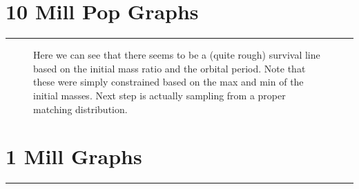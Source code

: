 \documentclass{article}
\theoremstyle{mytheoremstyle}
\theoremstyle{mytheoremstyle}
\theoremstyle{myproblemstyle}
\theoremstyle{myproblemstyle}
\newcounter{const}
\begin{document}
    \pagebreak
    \section{10 Mill Pop Graphs}
    \hrule
    \vspace{.5cm}




    



    \resizebox{0.9\textwidth}{!}{\label{g:OP-BH-Sol}} 

    \resizebox{0.9\textwidth}{!}{\label{g:OP-BH-Sol}} 

    \resizebox{0.9\textwidth}{!}{\label{g:OP-BH-Sol}} 
    
    \resizebox{0.9\textwidth}{!}{\label{g:BHSol_Masses}}

    \resizebox{0.9\textwidth}{!}{\label{g:OP-BH-Sol}} 


    \begin{figure}[h!]
    \resizebox{0.9\textwidth}{!}{}
    
    \caption{Here we can see that there seems to be a (quite rough) survival line based on the initial mass ratio and the orbital period. Note that these were simply constrained based on the max and min of the initial masses. Next step is actually sampling from a proper matching distribution.}
      
    \end{figure}

    \begin{figure}[h!]
    \resizebox{0.9\textwidth}{!}{}
    
    \end{figure}

    \pagebreak
    \section{1 Mill Graphs}
    \hrule
    \vspace{.5cm}
    
    \resizebox{0.9\textwidth}{!}{\label{g:OP-BH-Sol}}

    \resizebox{0.9\textwidth}{!}{\label{g:OP-BH-Sol}} 

    \resizebox{0.9\textwidth}{!}{\label{g:OP-BH-Sol}} 

    \resizebox{0.9\textwidth}{!}{\label{g:OP-BH-Sol}} 

    \resizebox{0.9\textwidth}{!}{\label{g:OP-BH-Sol}} 
\end{document}
